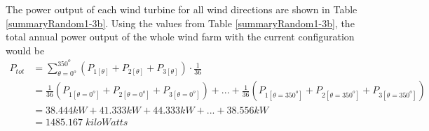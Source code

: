	The power output of each wind turbine for all wind directions are shown in Table \ref{summaryRandom1-3b}. Using the values from Table \ref{summaryRandom1-3b}, the total annual power output of the whole wind farm with the current configuration would be
    \begin{align*}
        P_{tot}
        &= \sum_{\theta=0^o}^{350^o} \left( P_{1[\theta]} + P_{2[\theta]} + P_{3[\theta]} \right) \cdot \frac{1}{36} \\
        &= \frac{1}{36}\left( P_{1[\theta=0^o]} + P_{2[\theta=0^o]} + P_{3[\theta=0^o]} \right) +...+ \frac{1}{36}\left( P_{1[\theta=350^o]} + P_{2[\theta=350^o]} + P_{3[\theta=350^o]} \right) \\
        &= 38.444kW + 41.333kW + 44.333kW +...+ 38.556kW \\
        &= 1485.167\;kiloWatts
    \end{align*}

